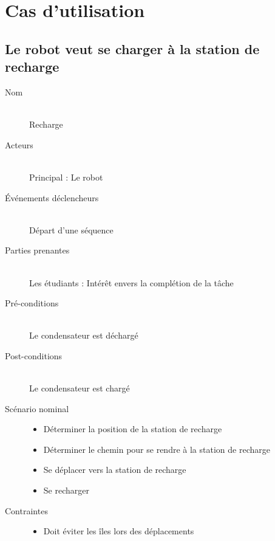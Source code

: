 \chapter{Cas d'utilisation}

\renewcommand{\labelitemi}{$\bullet$}
\renewcommand{\labelitemii}{$\circ$}

\section{Le robot veut se charger à la station de recharge}
\begin{description}
\item[Nom]  \hfill \\
  Recharge
\item[Acteurs] \hfill \\
  Principal : Le robot
\item[Événements déclencheurs] \hfill \\
  Départ d'une séquence
\item[Parties prenantes] \hfill \\
  Les étudiants : Intérêt envers la complétion de la tâche
\item[Pré-conditions] \hfill \\
  Le condensateur est déchargé
\item[Post-conditions] \hfill \\
  Le condensateur est chargé
\item[Scénario nominal] \hfill
  \begin{itemize}
  \item Déterminer la position de la station de recharge
  \item Déterminer le chemin pour se rendre à la station de recharge
  \item Se déplacer vers la station de recharge
  \item Se recharger
  \end{itemize}
\item[Contraintes] \hfill
  \begin{itemize}
  \item Doit éviter les îles lors des déplacements
  \end{itemize}
\end{description}

